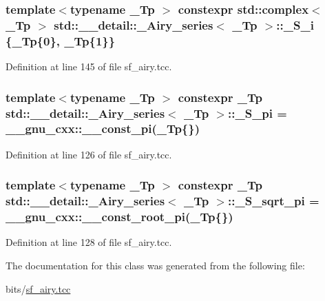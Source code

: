 \subsubsection[{\texorpdfstring{\+\_\+\+S\+\_\+i}{_S_i}}]{\setlength{\rightskip}{0pt plus 5cm}template$<$typename \+\_\+\+Tp $>$ constexpr std\+::complex$<$ \+\_\+\+Tp $>$ {\bf std\+::\+\_\+\+\_\+detail\+::\+\_\+\+Airy\+\_\+series}$<$ \+\_\+\+Tp $>$\+::\+\_\+\+S\+\_\+i \{\+\_\+\+Tp\{0\}, \+\_\+\+Tp\{1\}\}\hspace{0.3cm}{\ttfamily [static]}}\hypertarget{classstd_1_1____detail_1_1__Airy__series_a4133b308af0c967a73c918af22c93b09}{}\label{classstd_1_1____detail_1_1__Airy__series_a4133b308af0c967a73c918af22c93b09}


Definition at line 145 of file sf\+\_\+airy.\+tcc.

\subsubsection[{\texorpdfstring{\+\_\+\+S\+\_\+pi}{_S_pi}}]{\setlength{\rightskip}{0pt plus 5cm}template$<$typename \+\_\+\+Tp $>$ constexpr \+\_\+\+Tp {\bf std\+::\+\_\+\+\_\+detail\+::\+\_\+\+Airy\+\_\+series}$<$ \+\_\+\+Tp $>$\+::\+\_\+\+S\+\_\+pi = \+\_\+\+\_\+gnu\+\_\+cxx\+::\+\_\+\+\_\+const\+\_\+pi(\+\_\+\+Tp\{\})\hspace{0.3cm}{\ttfamily [static]}}\hypertarget{classstd_1_1____detail_1_1__Airy__series_a9de354dae47d41acc60824681d864184}{}\label{classstd_1_1____detail_1_1__Airy__series_a9de354dae47d41acc60824681d864184}


Definition at line 126 of file sf\+\_\+airy.\+tcc.

\subsubsection[{\texorpdfstring{\+\_\+\+S\+\_\+sqrt\+\_\+pi}{_S_sqrt_pi}}]{\setlength{\rightskip}{0pt plus 5cm}template$<$typename \+\_\+\+Tp $>$ constexpr \+\_\+\+Tp {\bf std\+::\+\_\+\+\_\+detail\+::\+\_\+\+Airy\+\_\+series}$<$ \+\_\+\+Tp $>$\+::\+\_\+\+S\+\_\+sqrt\+\_\+pi = \+\_\+\+\_\+gnu\+\_\+cxx\+::\+\_\+\+\_\+const\+\_\+root\+\_\+pi(\+\_\+\+Tp\{\})\hspace{0.3cm}{\ttfamily [static]}}\hypertarget{classstd_1_1____detail_1_1__Airy__series_a3fd1fba37ef8beb0d89854d4e58b8a38}{}\label{classstd_1_1____detail_1_1__Airy__series_a3fd1fba37ef8beb0d89854d4e58b8a38}


Definition at line 128 of file sf\+\_\+airy.\+tcc.



The documentation for this class was generated from the following file\+:\begin{DoxyCompactItemize}
\item 
bits/\hyperlink{sf__airy_8tcc}{sf\+\_\+airy.\+tcc}\end{DoxyCompactItemize}
